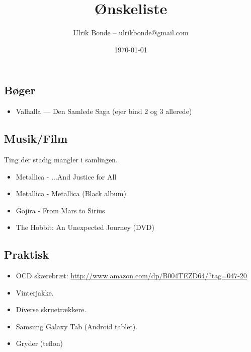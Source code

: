 \documentclass[a4paper, danish, 10pt, final]{article}
\title{Ønskeliste}
\author{Ulrik Bonde -- ulrikbonde@gmail.com}
\date{\today}
\begin{document}
\maketitle

\subsection*{Bøger}

\begin{itemize}
    \item Valhalla --- Den Samlede Saga (ejer bind 2 og 3 allerede)
\end{itemize}


\subsection*{Musik/Film}
Ting der stadig mangler i samlingen.
\begin{itemize}
    \item Metallica - ...And Justice for All
    \item Metallica - Metallica (Black album)
    \item Gojira - From Mars to Sirius
    \item The Hobbit: An Unexpected Journey (DVD)
\end{itemize}


\subsection*{Praktisk}
\begin{itemize}
    \item OCD skærebræt: \url{http://www.amazon.com/dp/B004TEZD64/?tag=047-20}
    \item Vinterjakke.
    \item Diverse skruetrækkere.
    \item Samsung Galaxy Tab (Android tablet).
    \item Gryder (teflon)
\end{itemize}


%
%
\end{document}
